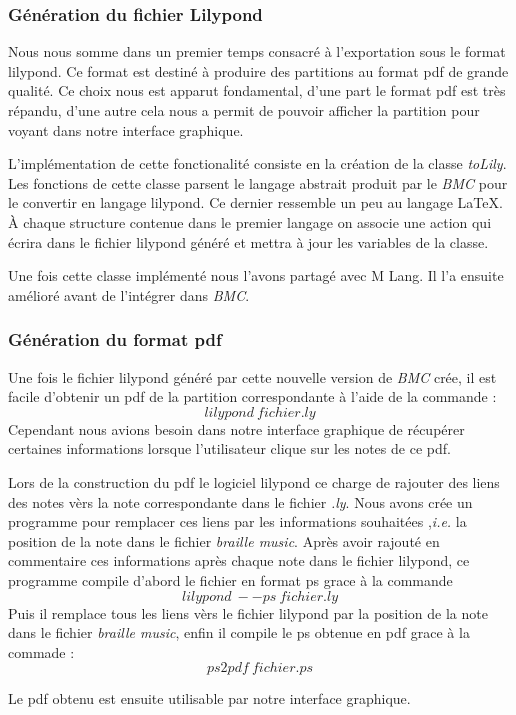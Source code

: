 
\subsubsection{Génération du fichier Lilypond}
Nous nous somme dans un premier temps consacré à l'exportation sous le
format lilypond.  Ce format est destiné à produire des partitions au
format pdf de grande qualité.  Ce choix nous est apparut fondamental,
d'une part le format pdf est très répandu, d'une autre cela nous a
permit de pouvoir afficher la partition pour voyant dans notre
interface graphique.

L'implémentation de cette fonctionalité consiste en la création de la
classe \textit{toLily}. Les fonctions de cette classe parsent le
langage abstrait produit par le \textit{BMC} pour le convertir en langage
lilypond. Ce dernier ressemble un peu au langage \LaTeX. À chaque
structure contenue dans le premier langage on associe une action qui
écrira dans le fichier lilypond généré et mettra à jour les variables
de la classe.

Une fois cette classe implémenté nous l'avons partagé avec M Lang. Il
l'a ensuite amélioré avant de l'intégrer dans \textit{BMC}.


\subsubsection{Génération du format pdf}
Une fois le fichier lilypond généré par cette nouvelle version de \textit{BMC}
crée, il est facile d'obtenir un pdf de la partition correspondante à
l'aide de la commande : $$lilypond\ fichier.ly$$ Cependant nous
avions besoin dans notre interface graphique de récupérer certaines
informations lorsque l'utilisateur clique sur les notes de ce pdf.

Lors de la construction du pdf le logiciel lilypond ce charge de
rajouter des liens des notes vèrs la note correspondante dans le
fichier \textit{.ly}. Nous avons crée un programme pour remplacer ces
liens par les informations souhaitées ,\textit{i.e.} la position de la
note dans le fichier \textit{braille music}. Après avoir rajouté en commentaire
ces informations après chaque note dans le fichier lilypond, ce
programme compile d'abord le fichier en format ps grace à la commande
$$lilypond\ --ps\ fichier.ly$$ Puis il remplace tous les liens
vèrs le fichier lilypond par la position de la note dans le fichier
\textit{braille music}, enfin il compile le ps obtenue en pdf grace à la
commade : $$ps2pdf\ fichier.ps$$

Le pdf obtenu est ensuite utilisable par notre interface graphique.
